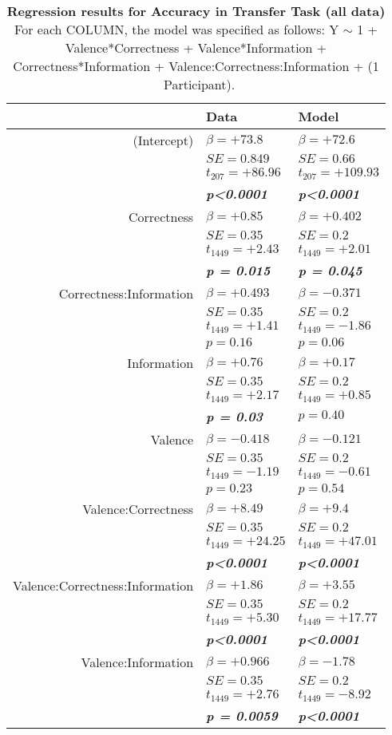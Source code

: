 \begin{table}
\centering \footnotesize
\begin{tabular}{r|ll}
\hline \hline
& \textbf{Data}& \textbf{Model} \\
\hline
\hline (Intercept)&$\beta=+73.8$&$\beta=+72.6$\\
&$SE=0.849$&$SE=0.66$\\
&$t_{207}=+86.96$&$t_{207}=+109.93$\\
&\textbf{\textit{p\textless0.0001}}&\textbf{\textit{p\textless0.0001}}\\
\hline Correctness&$\beta=+0.85$&$\beta=+0.402$\\
&$SE=0.35$&$SE=0.2$\\
&$t_{1449}=+2.43$&$t_{1449}=+2.01$\\
&\textbf{\textit{p = 0.015}}&\textbf{\textit{p = 0.045}}\\
\hline Correctness:Information&$\beta=+0.493$&$\beta=-0.371$\\
&$SE=0.35$&$SE=0.2$\\
&$t_{1449}=+1.41$&$t_{1449}=-1.86$\\
&$p=0.16$&$p=0.06$\\
\hline Information&$\beta=+0.76$&$\beta=+0.17$\\
&$SE=0.35$&$SE=0.2$\\
&$t_{1449}=+2.17$&$t_{1449}=+0.85$\\
&\textbf{\textit{p = 0.03}}&$p=0.40$\\
\hline Valence&$\beta=-0.418$&$\beta=-0.121$\\
&$SE=0.35$&$SE=0.2$\\
&$t_{1449}=-1.19$&$t_{1449}=-0.61$\\
&$p=0.23$&$p=0.54$\\
\hline Valence:Correctness&$\beta=+8.49$&$\beta=+9.4$\\
&$SE=0.35$&$SE=0.2$\\
&$t_{1449}=+24.25$&$t_{1449}=+47.01$\\
&\textbf{\textit{p\textless0.0001}}&\textbf{\textit{p\textless0.0001}}\\
\hline Valence:Correctness:Information&$\beta=+1.86$&$\beta=+3.55$\\
&$SE=0.35$&$SE=0.2$\\
&$t_{1449}=+5.30$&$t_{1449}=+17.77$\\
&\textbf{\textit{p\textless0.0001}}&\textbf{\textit{p\textless0.0001}}\\
\hline Valence:Information&$\beta=+0.966$&$\beta=-1.78$\\
&$SE=0.35$&$SE=0.2$\\
&$t_{1449}=+2.76$&$t_{1449}=-8.92$\\
&\textbf{\textit{p = 0.0059}}&\textbf{\textit{p\textless0.0001}}\\
\hline \hline
\end{tabular}
\caption{\textbf{Regression results for Accuracy in Transfer Task (all data)} For each COLUMN, the model was specified as follows: Y $\sim$ 1 + Valence*Correctness + Valence*Information + Correctness*Information + Valence:Correctness:Information + (1 \textbar \ Participant).}
\label{tab:regTTAccuracy_allexp}
\end{table}
